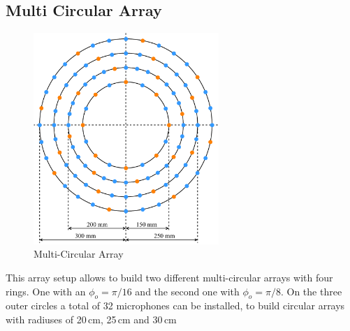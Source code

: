 \subsection{Multi Circular Array}
\begin{minipage}{\linewidth}
	\begin{figure}
		\vspace{-0.8cm}
		\includegraphics[width=7cm]{images/5_array_evaluation/prototype_array_multi_circular.pdf}
		\centering
		\caption{Multi-Circular Array}
		\label{fig:prototype_array_multi_circular}
	\end{figure}
	This array setup allows to build two different multi-circular arrays with four rings.
	One with an $\phi_o = \pi/16$ and the second one with $\phi_o = \pi / 8$.
	On the three outer circles a total of 32 microphones can be installed, to
	build circular arrays with radiuses of 20\,cm, 25\,cm and 30\,cm
\end{minipage}
\vspace{5cm}    %

